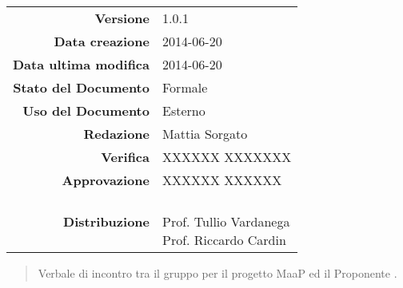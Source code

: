 
\newcommand{\Versione}{1.0.1}						%
\newcommand{\Data}{2014-06-20}						%
\newcommand{\DataUltimaModifica}{2014-06-20}
\newcommand{\TipoDocumento}{Verbale esterno 2014-06-20}		%




\begin{center}
\begin{tabular}{r|l}
\textbf{Versione} & \Versione{} \\
\textbf{Data creazione} & \Data{} \\
\textbf{Data ultima modifica} & \DataUltimaModifica{} \\
\textbf{Stato del Documento} & Formale \\		%
\textbf{Uso del Documento} & Esterno \\			%
\textbf{Redazione} & Mattia Sorgato \\				%
\textbf{Verifica} & XXXXXX XXXXXXX \\		%
\textbf{Approvazione} & XXXXXX XXXXXX \\		%
\textbf{Distribuzione} & \parbox[t]{4cm}{\NomeGruppo{} \\Prof. Tullio Vardanega \\ Prof. Riccardo Cardin \\ \Prop{} }\\
\end{tabular}
\end{center}

\vspace{0.05in}

\begin{abstract}
\begin{center}
Verbale di incontro tra il gruppo \NomeGruppo{} per il progetto MaaP ed il Proponente \Prop{}.
\end{center}
\end{abstract}

